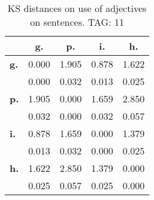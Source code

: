 \begin{table}[h!]
\begin{center}
\begin{tabular}{| l || c | c | c | c |}\hline
 & {\bf g.} & {\bf p.} & {\bf i.} & {\bf h.} \\\hline\hline
{\bf g.} & 0.000 & 1.905 & 0.878 & 1.622 \\
{\bf } & 0.000 & 0.032 & 0.013 & 0.025 \\\hline
{\bf p.} & 1.905 & 0.000 & 1.659 & 2.850 \\
{\bf } & 0.032 & 0.000 & 0.032 & 0.057 \\\hline
{\bf i.} & 0.878 & 1.659 & 0.000 & 1.379 \\
{\bf } & 0.013 & 0.032 & 0.000 & 0.025 \\\hline
{\bf h.} & 1.622 & 2.850 & 1.379 & 0.000 \\
{\bf } & 0.025 & 0.057 & 0.025 & 0.000 \\\hline
\end{tabular}
\caption{KS distances on use of adjectives on sentences. TAG: 11}
\end{center}
\end{table}